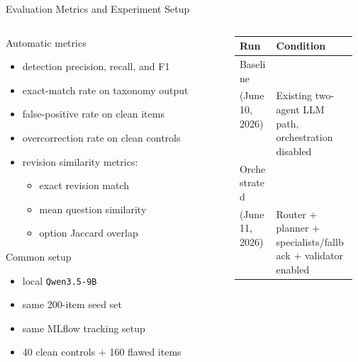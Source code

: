 \documentclass[aspectratio=169]{beamer}
\begin{document}
\begin{frame}[shrink=6]{Evaluation Metrics and Experiment Setup}
  \footnotesize
  \begin{columns}[T,onlytextwidth]
    \begin{column}{0.53\textwidth}
      \begin{block}{Automatic metrics}
        \begin{itemize}
          \item detection precision, recall, and F1
          \item exact-match rate on taxonomy output
          \item false-positive rate on clean items
          \item overcorrection rate on clean controls
          \item revision similarity metrics:
          \begin{itemize}
            \item exact revision match
            \item mean question similarity
            \item option Jaccard overlap
          \end{itemize}
        \end{itemize}
      \end{block}

      \begin{block}{Common setup}
        \begin{itemize}
          \item local \texttt{Qwen3.5-9B}
          \item same 200-item seed set
          \item same MLflow tracking setup
          \item 40 clean controls + 160 flawed items
        \end{itemize}
      \end{block}
    \end{column}
    \begin{column}{0.44\textwidth}
      \scriptsize
      \begin{table}
        \centering
        \begin{tabularx}{\linewidth}{L{0.31\linewidth}Y}
          \toprule
          Run & Condition \\
          \midrule
          Baseline\\(June 10, 2026) & Existing two-agent LLM path, orchestration disabled \\
          Orchestrated\\(June 11, 2026) & Router + planner + specialists/fallback + validator enabled \\
          \bottomrule
        \end{tabularx}
      \end{table}


\end{column}
\end{columns}
\end{frame}
\end{document}
